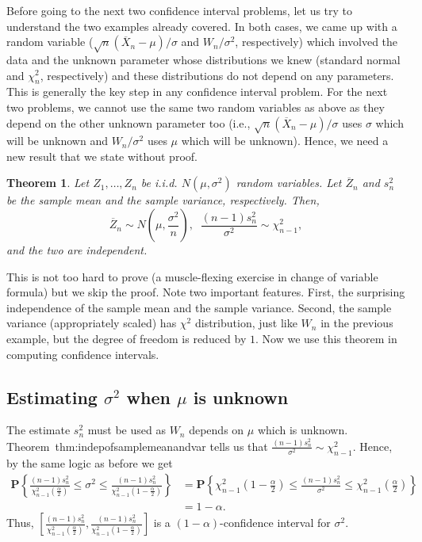 \documentclass[preprint,  11pt]{amsart}
\newcommand{\para}[1]{\vspace{4mm}\noindent{\bfseries #1:}}
\theoremstyle{plain} %
\newtheorem{theorem}{Theorem}
\theoremstyle{definition} %
\begin{document}
\para{An important result} Before going to the next two confidence interval problems, let us try to understand the two examples already covered. In both cases, we came up with a random variable ($\sqrt{n}(\overline{X}_{n}-\mu)/{\sigma}$ and $W_{n}/{\sigma}^{2}$, respectively) which involved the data and the unknown parameter  whose distributions we knew (standard normal and $\chi^{2}_{n}$, respectively) and these distributions do not depend on any parameters. This is generally the key step in any confidence interval problem. For the next two problems, we cannot use the same two random variables as above as they depend on the other unknown parameter too (i.e.,  $\sqrt{n}(\overline{X}_{n}-\mu)/{\sigma}$ uses ${\sigma}$ which will be unknown and $W_{n}/{\sigma}^{2}$ uses $\mu$ which will be unknown). Hence, we need a new result that we state without proof.

\begin{theorem}\label{thm:indepofsamplemeanandvar} Let $Z_{1},\ldots ,Z_{n}$ be i.i.d. $N(\mu,{\sigma}^{2})$ random variables. Let $\overline{Z}_{n}$ and $s_{n}^{2}$ be the sample mean and the sample variance, respectively. Then, 
$$
\overline{Z}_{n}\sim N(\mu,\frac{{\sigma}^{2}}{n}), \;\;  \frac{(n-1)s_{n}^{2}}{{\sigma}^{2}}\sim \chi^{2}_{n-1}, 
$$
and the two are independent.
\end{theorem}
This is not too hard to prove (a muscle-flexing exercise in change of variable formula) but we skip the proof. Note two important features. First, the surprising independence of the sample mean and the sample variance. Second, the sample variance (appropriately scaled) has $\chi^{2}$ distribution, just like $W_{n}$ in the previous example, but the degree of freedom is reduced by $1$. Now we use this theorem in computing confidence intervals.


\subsection{Estimating ${\sigma}^{2}$ when $\mu$ is unknown}
The estimate $s_{n}^{2}$ must be used as $W_{n}$ depends on $\mu$ which is unknown. Theorem~{thm:indepofsamplemeanandvar} tells us that $\frac{(n-1)s_{n}^{2}}{{\sigma}^{2}}\sim \chi^{2}_{n-1}$. Hence, by the same logic as before we get
\begin{align*}
\mathbf{P}\left\{   \frac{(n-1)s_{n}^{2}}{\chi_{n-1}^{2}\left(\frac{\alpha}{2}\right)} \le {\sigma}^{2}\le \frac{(n-1)s_{n}^{2}}{\chi_{n-1}^{2}\left(1-\frac{\alpha}{2}\right)}\right\}&=\mathbf{P}\left\{ \chi_{n-1}^{2}\left(1-\frac{\alpha}{2}\right) \le \frac{(n-1)s_{n}^{2}}{{\sigma}^{2}} \le \chi_{n-1}^{2}\left(\frac{\alpha}{2}\right)\right\} \\
&=1-\alpha.
\end{align*}
 Thus, $\left[\frac{(n-1)s_{n}^{2}}{\chi_{n-1}^{2}\left(\frac{\alpha}{2}\right)} ,\frac{(n-1)s_{n}^{2}}{\chi_{n-1}^{2}\left(1-\frac{\alpha}{2}\right)}\right]$ is a $(1-\alpha)$-confidence interval for ${\sigma}^{2}$.
\end{document}
